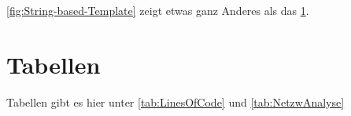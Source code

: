 	\cref{fig:String-based-Template} zeigt etwas ganz Anderes als das \cref{lst:backboneExtend}.
	\begin{figure}[h]
		
		\label{lst:backboneExtend}
	\end{figure}
\section{Tabellen}
	Tabellen gibt es hier unter \cref{tab:LinesOfCode} und \cref{tab:NetzwAnalyse}
	\begin{table}[htbp] 
		\scriptsize
		
		\label{tab:LinesOfCode}
	\end{table}
	\begin{table}[htbp] 
		\scriptsize
		
		\label{tab:NetzwAnalyse}
	\end{table}
 			
